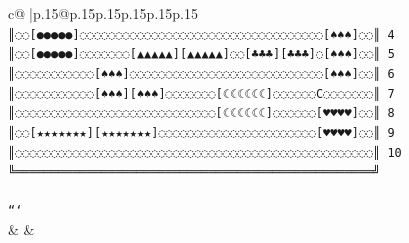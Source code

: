 \documentclass{article}
\begin{document}
{\begin{supertabular}{c@{$\;$}|p{.15\linewidth}@{}p{.15\linewidth}p{.15\linewidth}p{.15\linewidth}p{.15\linewidth}p{.15\linewidth}}
{{{\texttt{║◌◌{[}●●●●●{]}◌◌◌◌◌◌◌◌◌◌◌◌◌◌◌◌◌◌◌◌◌◌◌◌◌◌◌◌◌◌◌◌◌◌{[}♠♠♠{]}◌◌║ 4} \\
\texttt{║◌◌{[}●●●●●{]}◌◌◌◌◌◌◌{[}▲▲▲▲▲{]}{[}▲▲▲▲▲{]}◌◌{[}♣♣♣{]}{[}♣♣♣{]}◌{[}♠♠♠{]}◌◌║ 5} \\
\texttt{║◌◌◌◌◌◌◌◌◌◌◌{[}♠♠♠{]}◌◌◌◌◌◌◌◌◌◌◌◌◌◌◌◌◌◌◌◌◌◌◌◌◌◌◌{[}♠♠♠{]}◌◌║ 6} \\
\texttt{║◌◌◌◌◌◌◌◌◌◌◌{[}♠♠♠{]}{[}♠♠♠{]}◌◌◌◌◌◌◌{[}☾☾☾☾☾☾{]}◌◌◌◌◌◌C◌◌◌◌◌◌◌║ 7} \\
\texttt{║◌◌◌◌◌◌◌◌◌◌◌◌◌◌◌◌◌◌◌◌◌◌◌◌◌◌◌◌{[}☾☾☾☾☾☾{]}◌◌◌◌◌◌{[}♥♥♥♥{]}◌◌║ 8} \\
\texttt{║◌◌{[}★★★★★★★{]}{[}★★★★★★★{]}◌◌◌◌◌◌◌◌◌◌◌◌◌◌◌◌◌◌◌◌◌◌{[}♥♥♥♥{]}◌◌║ 9} \\
\texttt{║◌◌◌◌◌◌◌◌◌◌◌◌◌◌◌◌◌◌◌◌◌◌◌◌◌◌◌◌◌◌◌◌◌◌◌◌◌◌◌◌◌◌◌◌◌◌◌◌◌◌║ 10} \\
\texttt{╚══════════════════════════════════════════════════╝} \\
\\ 
\texttt{```} \\
            }
        }
    }
    & & \\ \\


\end{supertabular}}
\end{document}
